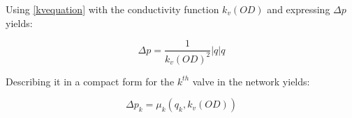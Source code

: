 Using \eqref{kvequation} with the conductivity function $k_v(OD)$ and expressing $\Delta p$ yields: 

\begin{equation}
\label{CompleteValveModel}
 \Delta p = \frac{1}{k_v(OD)^2} |q| q
\end{equation}

Describing it in a compact form for the $k^{th}$ valve in the network yields: 

\begin{equation}
\label{CompactValveModel}
 \Delta p_k = \mu_k(q_k,k_v(OD)) 
\end{equation}





 
 
 